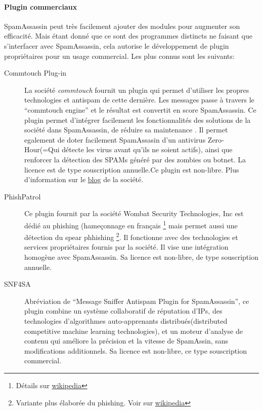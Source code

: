 \documentclass[a4paper,11pt]{article}
\begin{document}
\paragraph{Plugin commerciaux}
SpamAssassin peut très facilement ajouter des modules pour augmenter son efficacité. Mais étant donné 
que ce sont des programmes distincts ne faisant que s'interfacer avec SpamAssassin, cela
autorise le développement de plugin propriétaires pour un usage commercial. Les plus connus sont les suivants:
\begin{description}
 \item [Commtouch Plug-in] La société \emph{commtouch} fournit un plugin qui permet d'utiliser les propres technologies
 et antispam de cette dernière. Les messages passe à travers le ``commtouch engine'' et le résultat est convertit en score SpamAssassin.
 Ce plugin permet d'intégrer facilement les fonctionnalités des solutions de la société dans SpamAssassin, de réduire 
 sa maintenance . Il permet egalement de doter facilement SpamAssasin d'un antivirus Zero-Hour(=Qui détecte les virus avant qu'ils ne soient actifs),
 ainsi que renforcer la détection des SPAMs généré par des zombies ou botnet.
 La licence est de type souscription annuelle.Ce plugin est non-libre. 
 Plus d'information sur le \href{http://blog.cyren.com/articles/spamassassin-what-it-is-how-commtouchs-plug-works-with-it-1407.html}{blog} de la société.
 \item[PhishPatrol] Ce plugin fournit par la société Wombat Security Technologies, Inc est dédié au phishing (hameçonnage en français \footnote{Détails sur \href{http://fr.wikipedia.org/wiki/Hame\%C3\%A7onnage}{wikipedia}}
 mais permet aussi une détection du spear phhishing \footnote{Variante plus élaborée du phishing. Voir sur \href{http://fr.wikipedia.org/wiki/Spear_phishing}{wikipedia}}.
 Il fonctionne avec des technologies et services propriétaires fournis par la société. Il vise une intégration homogène avec SpamAssassin.
 Sa licence est non-libre, de type souscription annuelle.
 \item[SNF4SA] Abréviation de ``Message Sniffer Antispam Plugin for SpamAssassin'', ce plugin combine un système collaboratif de réputation
 d'IPs, des technologies d’algorithmes auto-apprenants distribués(distributed competitive machine learning technologies),
 et un moteur d'analyse de contenu qui améliore la précision et la vitesse de SpamAssin, sans modifications additionnels.
 Sa licence est non-libre, ce type souscription commercial.
\end{description}
\end{document}
